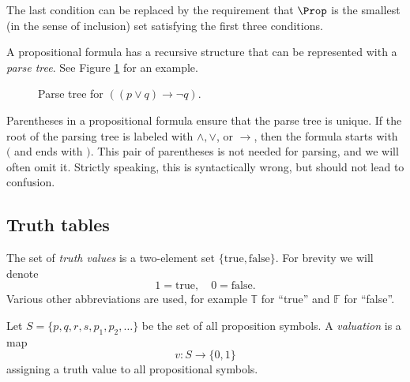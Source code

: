 \begin{page}
\setcounter{section}{1}
\setcounter{subsection}{2}
\setcounter{dfn}{1}
\label{portion:352}

The last condition can be replaced by the requirement that $\Prop$ is the smallest (in the sense of inclusion) set satisfying the first three conditions.

A propositional formula has a recursive structure that can be represented with a \emph{parse tree}.
See Figure \ref{fig:ParseTreeProp} for an example.

\begin{figure}[ht]
\begin{center}

\end{center}
\caption{Parse tree for $((p \vee q) \to \neg q)$.}
\label{fig:ParseTreeProp}
\end{figure}

Parentheses in a propositional formula ensure that the parse tree is unique.
If the root of the parsing tree is labeled with $\wedge, \vee$, or $\to$, then the formula starts with $($ and ends with $)$.
This pair of parentheses is not needed for parsing, and we will often omit it.
Strictly speaking, this is syntactically wrong, but should not lead to confusion.



\end{page}

\begin{page}
\setcounter{section}{1}
\setcounter{subsection}{2}
\setcounter{dfn}{1}
\label{portion:353}

\subsection{Truth tables}
The set of \emph{truth values} is a two-element set $\{\text{true}, \text{false}\}$.
For brevity we will denote
\[
1 = \text{true}, \quad 0 = \text{false}.
\]
Various other abbreviations are used, for example $\mathbb{T}$ for ``true'' and $\mathbb{F}$ for ``false''.


\end{page}

\begin{page}
\setcounter{section}{1}
\setcounter{subsection}{2}
\setcounter{dfn}{2}
\label{portion:355}

\begin{dfn}
Let $S = \{p, q, r, s, p_1, p_2, \ldots\}$ be the set of all proposition symbols.
A \emph{valuation} is a map
\[
v \colon S \to \{0,1\}
\]
assigning a truth value to all propositional symbols.
\end{dfn}

\end{page}


